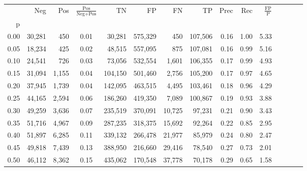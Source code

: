 \begin{tabular}{rrrcrrrrrrrrrrr}
\toprule
{} &     Neg &    Pos & $\frac{\text{Pos}}{\text{Neg}+\text{Pos}}$ &       TN &       FP &       FN &       TP &  Prec &   Rec & $\frac{\text{FP}}{\text{P}}$ \\
p    &         &        &                                            &          &          &          &          &       &       &                              \\
\midrule
0.00 &  30,281 &    450 &                                       0.01 &   30,281 &  575,329 &      450 &  107,506 &  0.16 &  1.00 &                         5.33 \\
0.05 &  18,234 &    425 &                                       0.02 &   48,515 &  557,095 &      875 &  107,081 &  0.16 &  0.99 &                         5.16 \\
0.10 &  24,541 &    726 &                                       0.03 &   73,056 &  532,554 &    1,601 &  106,355 &  0.17 &  0.99 &                         4.93 \\
0.15 &  31,094 &  1,155 &                                       0.04 &  104,150 &  501,460 &    2,756 &  105,200 &  0.17 &  0.97 &                         4.65 \\
0.20 &  37,945 &  1,739 &                                       0.04 &  142,095 &  463,515 &    4,495 &  103,461 &  0.18 &  0.96 &                         4.29 \\
0.25 &  44,165 &  2,594 &                                       0.06 &  186,260 &  419,350 &    7,089 &  100,867 &  0.19 &  0.93 &                         3.88 \\
0.30 &  49,259 &  3,636 &                                       0.07 &  235,519 &  370,091 &   10,725 &   97,231 &  0.21 &  0.90 &                         3.43 \\
0.35 &  51,716 &  4,967 &                                       0.09 &  287,235 &  318,375 &   15,692 &   92,264 &  0.22 &  0.85 &                         2.95 \\
0.40 &  51,897 &  6,285 &                                       0.11 &  339,132 &  266,478 &   21,977 &   85,979 &  0.24 &  0.80 &                         2.47 \\
0.45 &  49,818 &  7,439 &                                       0.13 &  388,950 &  216,660 &   29,416 &   78,540 &  0.27 &  0.73 &                         2.01 \\
0.50 &  46,112 &  8,362 &                                       0.15 &  435,062 &  170,548 &   37,778 &   70,178 &  0.29 &  0.65 &                         1.58 \\

\end{tabular}
